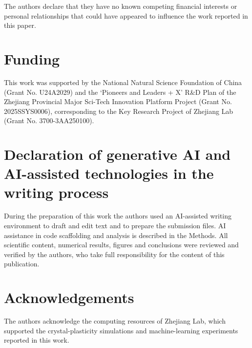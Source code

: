 \documentclass[12pt]{article}
\begin{document}
The authors declare that they have no known competing financial interests or personal relationships that could have appeared to influence the work reported in this paper.

\section*{Funding}

This work was supported by the National Natural Science Foundation of China (Grant No. U24A2029) and the `Pioneers and Leaders + X' R\&D Plan of the Zhejiang Provincial Major Sci-Tech Innovation Platform Project (Grant No. 2025SSYS0006), corresponding to the Key Research Project of Zhejiang Lab (Grant No. 3700-3AA250100).

\section*{Declaration of generative AI and AI-assisted technologies in the writing process}
During the preparation of this work the authors used an AI-assisted writing environment to draft and edit text and to prepare the submission files. AI assistance in code scaffolding and analysis is described in the Methods. All scientific content, numerical results, figures and conclusions were reviewed and verified by the authors, who take full responsibility for the content of this publication.
\section*{Acknowledgements}

The authors acknowledge the computing resources of Zhejiang Lab, which supported the crystal-plasticity simulations and machine-learning experiments reported in this work.
\end{document}
